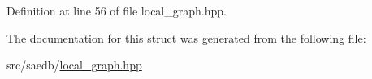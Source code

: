 Definition at line 56 of file local\-\_\-graph.\-hpp.



The documentation for this struct was generated from the following file\-:\begin{DoxyCompactItemize}
\item 
src/saedb/\hyperlink{local__graph_8hpp}{local\-\_\-graph.\-hpp}\end{DoxyCompactItemize}

